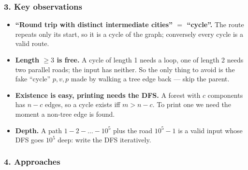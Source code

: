 \subsubsection*{3. Key observations}

\begin{itemize}[leftmargin=*]
    \item \textbf{``Round trip with distinct intermediate cities'' $=$ ``cycle''.} The route repeats only its start, so it is a cycle of the graph; conversely every cycle is a valid route.
    \item \textbf{Length $\ge 3$ is free.} A cycle of length 1 needs a loop, one of length 2 needs two parallel roads; the input has neither. So the only thing to avoid is the fake ``cycle'' $p, v, p$ made by walking a tree edge back --- skip the parent.
    \item \textbf{Existence is easy, printing needs the DFS.} A forest with $c$ components has $n - c$ edges, so a cycle exists iff $m > n - c$. To print one we need the moment a non-tree edge is found.
    \item \textbf{Depth.} A path $1 - 2 - \dots - 10^5$ plus the road $10^5 - 1$ is a valid input whose DFS goes $10^5$ deep: write the DFS iteratively.
\end{itemize}

\subsubsection*{4. Approaches}

